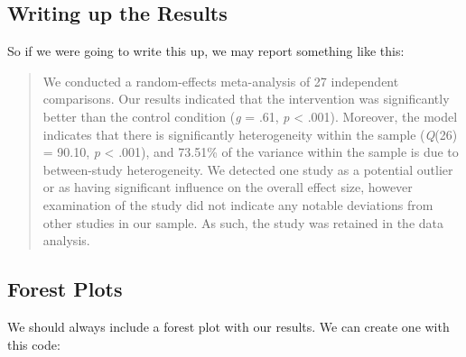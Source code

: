 \documentclass[
]{book}
\newenvironment{Shaded}{\begin{snugshade}}{\end{snugshade}}
\newcommand{\AttributeTok}[1]{\textcolor[rgb]{0.13,0.29,0.53}{#1}}
\newcommand{\CommentTok}[1]{\textcolor[rgb]{0.56,0.35,0.01}{\textit{#1}}}
\newcommand{\DecValTok}[1]{\textcolor[rgb]{0.00,0.00,0.81}{#1}}
\newcommand{\DocumentationTok}[1]{\textcolor[rgb]{0.56,0.35,0.01}{\textbf{\textit{#1}}}}
\newcommand{\FloatTok}[1]{\textcolor[rgb]{0.00,0.00,0.81}{#1}}
\newcommand{\FunctionTok}[1]{\textcolor[rgb]{0.13,0.29,0.53}{\textbf{#1}}}
\newcommand{\NormalTok}[1]{#1}
\newcommand{\OtherTok}[1]{\textcolor[rgb]{0.56,0.35,0.01}{#1}}
\newcommand{\SpecialCharTok}[1]{\textcolor[rgb]{0.81,0.36,0.00}{\textbf{#1}}}
\newcommand{\StringTok}[1]{\textcolor[rgb]{0.31,0.60,0.02}{#1}}
\begin{document}
\hypertarget{writing-up-the-results}{%
\subsection{Writing up the Results}\label{writing-up-the-results}}

So if we were going to write this up, we may report something like this:

\begin{quote}
We conducted a random-effects meta-analysis of 27 independent comparisons. Our results indicated that the intervention was significantly better than the control condition (\emph{g} = .61, \emph{p} \textless{} .001). Moreover, the model indicates that there is significantly heterogeneity within the sample (\emph{Q}(26) = 90.10, \emph{p} \textless{} .001), and 73.51\% of the variance within the sample is due to between-study heterogeneity. We detected one study as a potential outlier or as having significant influence on the overall effect size, however examination of the study did not indicate any notable deviations from other studies in our sample. As such, the study was retained in the data analysis.
\end{quote}

\hypertarget{forest-plots}{%
\subsection{Forest Plots}\label{forest-plots}}

We should always include a forest plot with our results. We can create one with this code:

\begin{Shaded}
\end{Shaded}
\end{document}
